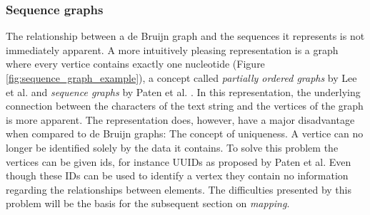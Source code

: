 \documentclass[thesis.tex]{subfiles}
\begin{document}
\subsubsection{Sequence graphs}
\label{sec:sequence_graphs}
The relationship between a de Bruijn graph and the sequences it represents is not immediately apparent. A more intuitively pleasing representation is a graph where every vertice contains exactly one nucleotide (Figure \ref{fig:sequence_graph_example}), a concept called \textit{partially ordered graphs} by Lee et al. \cite{multiple_sequence_alignment_using_partial_order_graphs} and \textit{sequence graphs} by Paten et al. \cite{mapping_to_a_reference_genome_structure}. In this representation, the underlying connection between the characters of the text string and the vertices of the graph is more apparent. The representation does, however, have a major disadvantage when compared to de Bruijn graphs: The concept of uniqueness. A vertice can no longer be identified solely by the data it contains. To solve this problem the vertices can be given ids, for instance UUIDs as proposed by Paten et al. Even though these IDs can be used to identify a vertex they contain no information regarding the relationships between elements. The difficulties presented by this problem will be the basis for the subsequent section on \textit{mapping}. 
\end{document}
